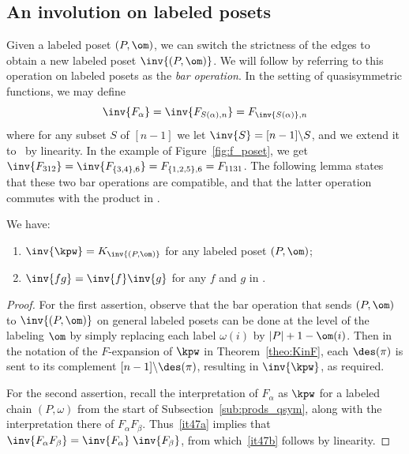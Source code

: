 \subsection{An involution on labeled posets}

Given a labeled poset $(P,\om)$, we can switch the strictness of the edges to obtain a new labeled poset $\inv{(P,\om)}$.  
We will follow \cite{McWa14} by referring to this operation on labeled posets as the \emph{bar operation}.  In the setting of quasisymmetric functions, we may define 
\[
\inv{F_\alpha} = \inv{F_{S(\alpha),n}} = F_{\inv{S(\alpha)},n}
\]
where for any subset $S$ of $[n-1]$ we let $\inv{S}=[n-1]\backslash S$,  and we extend it to \qsym\ by linearity.  In the example of Figure~\ref{fig:f_poset}, we get $\inv{F_{312}} = \inv{F_{\{3,4\},6}} = F_{\{1,2,5\},6}= F_{1131}$.
The following lemma states that these two bar operations are compatible, and that the latter operation commutes with the product in \qsym.
\begin{lemma}\label{lem:bar}
We have:
\begin{enumerate}[label=(\alph*)]
\item \label{it47a} $\inv{\kpw} = K_{\inv{(P,\om)}}$ for any labeled poset $(P,\om)$;
\item \label{it47b} $\inv{fg}=\inv{f}\inv{g}$ for any $f$ and $g$ in \qsym.
\end{enumerate}
\end{lemma}
\begin{proof}
For the first assertion, observe that the bar operation that sends $(P,\om)$ to $\inv{(P,\om)}$ on general labeled posets can be done at the level of the labeling $\om$ by simply replacing each label $\omega(i)$ by $|P|+1-\om(i)$.  Then in the notation of the $F$-expansion of $\kpw$ in Theorem~\ref{theo:KinF}, each $\des(\pi)$ is sent to its complement $[n-1]\backslash\des(\pi)$, resulting in $\inv{\kpw}$, as required.

For the second assertion, recall the interpretation of $F_\alpha$ as $\kpw$ for a labeled chain $(P,\omega)$ from the start of Subsection~\ref{sub:prods_qsym}, along with the interpretation there of $F_\alpha F_\beta$.
Thus~\ref{it47a} implies that $\inv{F_\alpha F_\beta} = \inv{F_\alpha} \; \inv{F_\beta}$, from which~\ref{it47b} follows by linearity.
\end{proof}
